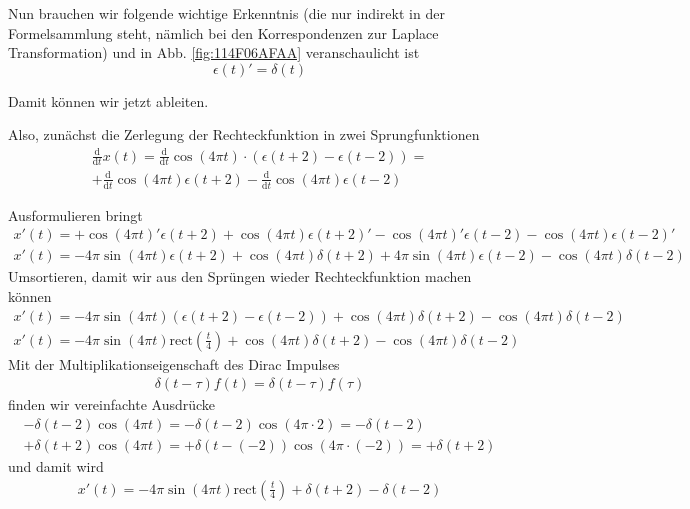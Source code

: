 \documentclass[11pt,a4paper,DIV=12]{scrartcl}
\numberwithin{equation}{section}
\numberwithin{figure}{section}
\newcommand\fsd{\mathrm{d}} %
\newcommand{\fig}[1]{Abb. \ref{#1}} %
\begin{document}
\begin{ExCalc}
Nun brauchen wir folgende wichtige Erkenntnis (die nur indirekt in der Formelsammlung
steht, nämlich bei den Korrespondenzen zur Laplace Transformation) und in
\fig{fig:114F06AFAA} veranschaulicht ist
\begin{equation}
  \epsilon(t)' = \delta(t)
\end{equation}

Damit können wir jetzt ableiten.

Also, zunächst die Zerlegung der Rechteckfunktion in zwei Sprungfunktionen
\begin{align}
\frac{\fsd }{\fsd t} x(t) =
\frac{\fsd }{\fsd t} \cos(4\pi t) \cdot \left( \epsilon(t+2) -\epsilon(t-2)\right)=\\
+ \frac{\fsd }{\fsd t} \cos(4\pi t) \epsilon(t+2)
- \frac{\fsd }{\fsd t} \cos(4\pi t) \epsilon(t-2)
\end{align}

Ausformulieren bringt
\begin{align}x'(t)=
+ \cos(4\pi t)' \epsilon(t+2) + \cos(4\pi t) \epsilon(t+2)'
- \cos(4\pi t)' \epsilon(t-2) - \cos(4\pi t) \epsilon(t-2)'
\end{align}
\begin{align}x'(t)=
- 4\pi\sin(4\pi t) \epsilon(t+2) + \cos(4\pi t) \delta(t+2)
+ 4\pi\sin(4\pi t) \epsilon(t-2) - \cos(4\pi t) \delta(t-2)
\end{align}
Umsortieren, damit wir aus den Sprüngen wieder Rechteckfunktion machen können
\begin{align}x'(t)=
- 4\pi\sin(4\pi t) (\epsilon(t+2) - \epsilon(t-2))
+ \cos(4\pi t) \delta(t+2)
- \cos(4\pi t) \delta(t-2)
\end{align}
\begin{align}x'(t)=
- 4\pi\sin(4\pi t) \mathrm{rect}(\frac{t}{4})
+ \cos(4\pi t) \delta(t+2)
- \cos(4\pi t) \delta(t-2)
\end{align}
Mit der Multiplikationseigenschaft des Dirac Impulses
\begin{align}
\delta(t-\tau) f(t) = \delta(t-\tau) f(\tau)
\end{align}
finden wir vereinfachte Ausdrücke
\begin{align}
- \delta(t-2) \cos(4\pi t) = - \delta(t-2) \cos(4\pi \cdot 2) = - \delta(t-2)\\
+ \delta(t+2) \cos(4\pi t) = + \delta(t-(-2)) \cos(4\pi \cdot (-2)) = + \delta(t+2)
\end{align}
und damit wird
\begin{align}x'(t)=
- 4\pi\sin(4\pi t) \mathrm{rect}(\frac{t}{4})
+ \delta(t+2)
- \delta(t-2)
\end{align}
\end{ExCalc}
\end{document}
